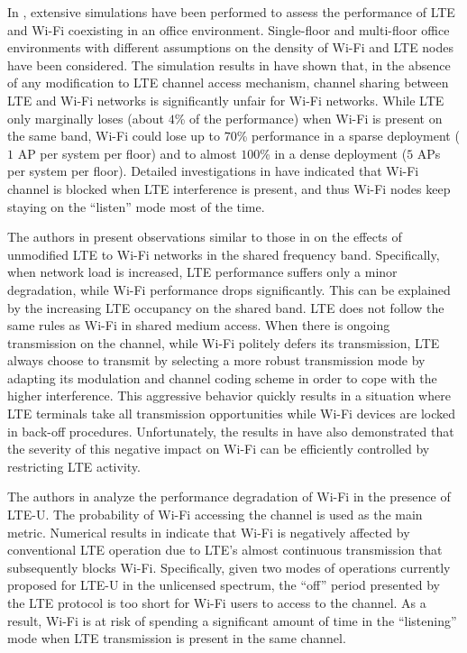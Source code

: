 In \cite{original-LTE-Wi-Fi-VTC-2013}, extensive simulations have been performed to assess the performance of LTE and Wi-Fi coexisting in an office environment. Single-floor and multi-floor office environments with different assumptions on the density of Wi-Fi and LTE nodes have been considered. The simulation results in \cite{original-LTE-Wi-Fi-VTC-2013} have shown that, in the absence of any modification to LTE channel access mechanism, channel sharing between LTE and Wi-Fi networks is significantly unfair for Wi-Fi networks. While LTE only marginally loses (about $4$\% of the performance) when Wi-Fi is present on the same band, Wi-Fi could lose up to $70$\% performance in a sparse deployment ($1$ AP per system per floor) and to almost $100$\% in a dense deployment ($5$ APs per system per floor). Detailed investigations in \cite{original-LTE-Wi-Fi-VTC-2013} have indicated that Wi-Fi channel is blocked when LTE interference is present, and thus Wi-Fi nodes keep staying on the ``listen'' mode most of the time.

The authors in \cite{original-LTE-Wi-Fi-WCNC-2013} present observations similar to those in \cite{original-LTE-Wi-Fi-VTC-2013} on the effects of unmodified LTE to Wi-Fi networks in the shared frequency band. Specifically, when network load is increased, LTE performance suffers only a minor degradation, while Wi-Fi performance drops significantly. This can be explained by the increasing LTE occupancy on the shared band. LTE does not follow the same rules as Wi-Fi in shared medium access. When there is ongoing transmission on the channel, while Wi-Fi politely defers its transmission, LTE always choose to transmit by selecting a more robust transmission mode by adapting its modulation and channel coding scheme in order to cope with the higher interference. This aggressive behavior quickly results in a situation where LTE terminals take all transmission opportunities while Wi-Fi devices are locked in back-off procedures. Unfortunately, the results in \cite{original-LTE-Wi-Fi-WCNC-2013} have also demonstrated that the severity of this negative impact on Wi-Fi can be efficiently controlled by restricting LTE activity.

The authors in \cite{LTE-U-PIMRC-2014} analyze the performance degradation of Wi-Fi in the presence of LTE-U. The probability of Wi-Fi accessing the channel is used as the main metric. Numerical results in \cite{LTE-U-PIMRC-2014} indicate that Wi-Fi is negatively affected by conventional LTE operation due to LTE's almost continuous transmission that subsequently blocks Wi-Fi. Specifically, given two modes of operations currently proposed for LTE-U in the unlicensed spectrum, the ``off'' period presented by the LTE protocol is too short for Wi-Fi users to access to the channel. As a result, Wi-Fi is at risk of spending a significant amount of time in the ``listening'' mode when LTE transmission is present in the same channel.

